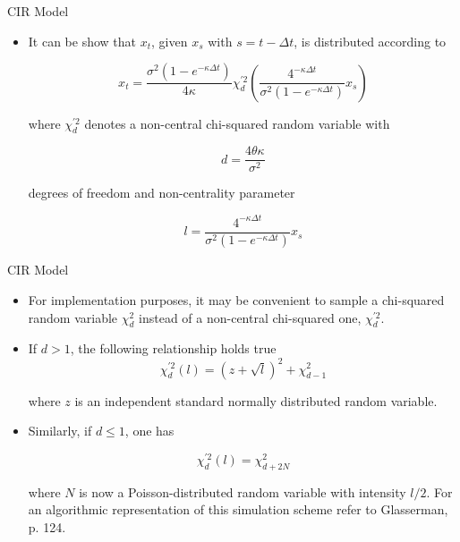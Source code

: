 \documentclass[11pt]{beamer}
\begin{document}
\begin{frame}{CIR Model}
\begin{itemize}


\item It can be show that $x_t$, given $x_s$ with $s = t - \Delta t$, is distributed according to

$$ 
x_t = \frac{\sigma^2 (1 - e^{-\kappa \Delta t})}{4\kappa} \chi^{\prime 2}_d \left( \frac{4^{-\kappa\Delta t}}{\sigma^2(1-e^{-\kappa \Delta t})} x_s \right)
$$

where  $\chi^{\prime 2}_d$ denotes a non-central chi-squared random variable with

$$d=\frac{4\theta \kappa}{\sigma^2}$$

degrees of freedom and non-centrality parameter

$$l= \frac{4^{-\kappa\Delta t}}{\sigma^2(1-e^{-\kappa \Delta t})} x_s $$


\end{itemize}
\end{frame}
\begin{frame}{CIR Model}
\begin{itemize}
\item For implementation purposes, it may be convenient to sample a chi-squared
random variable  $\chi^2_d$ instead of a non-central chi-squared one,  $\chi^{\prime 2}_d$. 

\item If $d > 1$, the following relationship holds true
$$
\chi^{\prime 2}_d (l) = (z + \sqrt{l})^2 + \chi^2_{d-1}
$$

where $z$ is an independent standard normally distributed random variable. 

\item Similarly, if $d \le 1$, one has 

$$
\chi^{\prime 2}_d (l) = \chi^2_{d+2N}
$$

where $N$ is now a Poisson-distributed random variable with intensity $l/2$. For an algorithmic representation of this simulation scheme refer to Glasserman, p. 124.
\end{itemize}
\end{frame}
\end{document}
